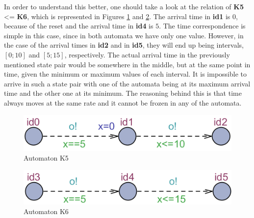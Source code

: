 In order to understand this better, one should take a look at the relation of \textbf{K5} <= \textbf{K6}, which is represented in Figures \ref{fig:K5} and \ref{fig:K6}. The arrival time in \textbf{id1} is $0$, because of the reset and the arrival time in \textbf{id4} is $5$. The time correspondence is simple in this case, since in both automata we have only one value. However, in the case of the arrival times in \textbf{id2} and in \textbf{id5}, they will end up being intervals, $[0;10]$ and $[5;15]$, respectively. The actual arrival time in the previously mentioned state pair would be somewhere in the middle, but at the same point in time, given the minimum or maximum values of each interval. It is impossible to arrive in such a state pair with one of the automata being at its maximum arrival time and the other one at its minimum. The reasoning behind this is that time always moves at the same rate and it cannot be frozen in any of the automata.
\begin{figure}
    \centering
    \includegraphics[scale = 0.7]{figures/K5.png}
    \caption{Automaton K5}
    \label{fig:K5}
\end{figure}
\begin{figure}
    \centering
    \includegraphics[scale = 0.7]{figures/K6.png}
    \caption{Automaton K6}
    \label{fig:K6}
\end{figure}



